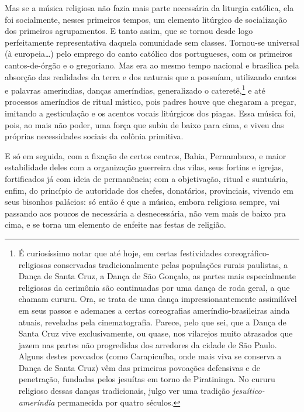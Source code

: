 Mas se a música religiosa não fazia mais parte necessária da liturgia
católica, ela foi socialmente, nesses primeiros tempos, um elemento
litúrgico de socialização dos primeiros agrupamentos. E tanto assim, que
se tornou desde logo perfeitamente representativa daquela comunidade sem
classes. Tornou-se universal (à europeia\ldots{}) pelo emprego do canto
católico dos portugueses, com os primeiros cantos-de-órgão e o
gregoriano. Mas era ao mesmo tempo nacional e brasílica pela absorção
das realidades da terra e dos naturais que a possuíam, utilizando cantos
e palavras ameríndias, danças ameríndias, generalizado o cateretê,\footnote{É curiosíssimo notar que até hoje, em certas festividades
  coreográfico-religiosas conservadas tradicionalmente pelas populações
  rurais paulistas, a Dança de Santa Cruz, a Dança de São Gonçalo, as
  partes mais especialmente religiosas da cerimônia são continuadas por
  uma dança de roda geral, a que chamam cururu. Ora, se trata de uma
  dança impressionantemente assimilável em seus passos e ademanes a
  certas coreografias ameríndio-brasileiras ainda atuais, reveladas pela
  cinematografia. Parece, pelo que sei, que a Dança de Santa Cruz vive
  exclusivamente, ou quase, nos vilarejos muito atrasados que jazem nas
  partes não progredidas dos arredores da cidade de São Paulo. Alguns
  destes povoados (como Carapicuíba, onde mais viva se conserva a Dança
  de Santa Cruz) vêm das primeiras povoações defensivas e de penetração,
  fundadas pelos jesuítas em torno de Piratininga. No cururu religioso
  dessas danças tradicionais, julgo ver uma tradição \textit{jesuítico-ameríndia}
  permanecida por quatro séculos.} e
até processos ameríndios de ritual místico, pois padres houve que
chegaram a pregar, imitando a gesticulação e os acentos vocais
litúrgicos dos piagas. Essa música foi, pois, ao mais não poder, uma
força que subiu de baixo para cima, e viveu das próprias necessidades
sociais da colônia primitiva.

E só em seguida, com a fixação de certos centros, Bahia, Pernambuco, e
maior estabilidade deles com a organização guerreira das vilas, seus
fortins e igrejas, fortificados já com ideia de permanência; com a
objetivação, ritual e suntuária, enfim, do princípio de autoridade dos
chefes, donatários, provinciais, vivendo em seus bisonhos palácios: só
então é que a música, embora religiosa sempre, vai passando aos poucos
de necessária a desnecessária, não vem mais de baixo pra cima, e se
torna um elemento de enfeite nas festas de religião.

